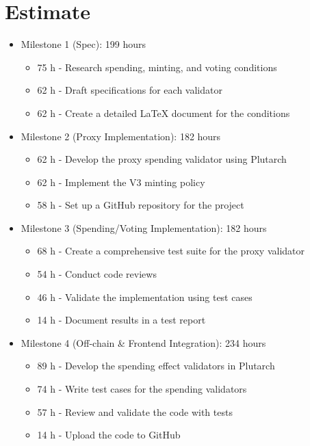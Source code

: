 \documentclass{article}
\begin{document}
\section{Estimate}

\begin{itemize}
  \item Milestone 1 (Spec): 199 hours
        \begin{itemize}
          \item 75 h - Research spending, minting, and voting conditions
          \item 62 h - Draft specifications for each validator
          \item 62 h - Create a detailed LaTeX document for the conditions
        \end{itemize}

  \item Milestone 2 (Proxy Implementation): 182 hours
        \begin{itemize}
          \item 62 h - Develop the proxy spending validator using Plutarch
          \item 62 h - Implement the V3 minting policy
          \item 58 h - Set up a GitHub repository for the project
        \end{itemize}

  \item Milestone 3 (Spending/Voting Implementation): 182 hours
        \begin{itemize}
          \item 68 h - Create a comprehensive test suite for the proxy validator
          \item 54 h - Conduct code reviews
          \item 46 h - Validate the implementation using test cases
          \item 14 h - Document results in a test report
        \end{itemize}

  \item Milestone 4 (Off-chain \& Frontend Integration): 234 hours
        \begin{itemize}
          \item 89 h - Develop the spending effect validators in Plutarch
          \item 74 h - Write test cases for the spending validators
          \item 57 h - Review and validate the code with tests
          \item 14 h - Upload the code to GitHub
        \end{itemize}


\end{itemize}
\end{document}
